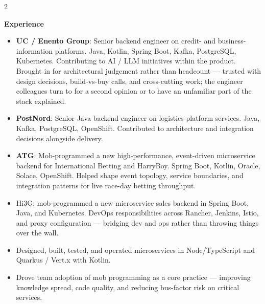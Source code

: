 \documentclass[10pt,a4paper,ragged2e,withhyper]{altacv}
\renewcommand{\cvsection}[1]{%
  \par\addvspace{1ex}%
  {\cvsectionfont\color{heading}#1}\par
  \smallskip{\color{headingrule}\rule{\linewidth}{1pt}}\par\smallskip}
\renewcommand{\cvsectionfont}{\LARGE\rmfamily\bfseries}
\begin{document}


\makecvheader


\begin{paracol}{2}
\cvsection{Experience}

\begin{itemize}
  \item \textbf{UC / Enento Group}: Senior
    backend engineer on credit- and business-information platforms.
    Java, Kotlin, Spring Boot, Kafka, PostgreSQL, Kubernetes.
    Contributing to AI / LLM initiatives within the product. Brought
    in for architectural judgement rather than headcount --- trusted
    with design decisions, build-vs-buy calls, and cross-cutting work;
    the engineer colleagues turn to for a second opinion or to have
    an unfamiliar part of the stack explained.
  \item \textbf{PostNord}: Senior Java backend
    engineer on logistics-platform services. Java, Kafka, PostgreSQL,
    OpenShift. Contributed to architecture and integration decisions
    alongside delivery.
  \item \textbf{ATG}: Mob-programmed a new high-performance,
    event-driven microservice backend for International Betting and
    HarryBoy. Spring Boot, Kotlin, Oracle, Solace, OpenShift. Helped
    shape event topology, service boundaries, and integration
    patterns for live race-day betting throughput.
\end{itemize}
\divider

\begin{itemize}
  \item Hi3G: mob-programmed a new microservice sales backend in
    Spring Boot, Java, and Kubernetes. DevOps responsibilities across
    Rancher, Jenkins, Istio, and proxy configuration --- bridging dev
    and ops rather than throwing things over the wall.
\end{itemize}
\divider

\begin{itemize}
  \item Designed, built, tested, and operated microservices in
    Node/TypeScript and Quarkus / Vert.x with Kotlin.
  \item Drove team adoption of mob programming as a core practice ---
    improving knowledge spread, code quality, and reducing bus-factor
    risk on critical services.
\end{itemize}
\divider


\end{paracol}
\end{document}

